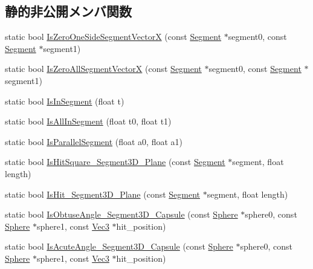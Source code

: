 \subsection*{静的非公開メンバ関数}
\begin{DoxyCompactItemize}
\item 
static bool \mbox{\hyperlink{class_collision_judgment_ab2e5a2c714c8c7c7f26ef9b025b57d01}{Is\+Zero\+One\+Side\+Segment\+VectorX}} (const \mbox{\hyperlink{class_segment}{Segment}} $\ast$segment0, const \mbox{\hyperlink{class_segment}{Segment}} $\ast$segment1)
\item 
static bool \mbox{\hyperlink{class_collision_judgment_adf77fae28d72345f9fda1668a1077f0d}{Is\+Zero\+All\+Segment\+VectorX}} (const \mbox{\hyperlink{class_segment}{Segment}} $\ast$segment0, const \mbox{\hyperlink{class_segment}{Segment}} $\ast$segment1)
\item 
static bool \mbox{\hyperlink{class_collision_judgment_a5fd5784d3e7d0ce09f5bda5603a8ca36}{Is\+In\+Segment}} (float t)
\item 
static bool \mbox{\hyperlink{class_collision_judgment_a4aa40ec5573967470aeac8f7cb59b67d}{Is\+All\+In\+Segment}} (float t0, float t1)
\item 
static bool \mbox{\hyperlink{class_collision_judgment_a5176f1eb6b0a2fd70efc0c08054064d0}{Is\+Parallel\+Segment}} (float a0, float a1)
\item 
static bool \mbox{\hyperlink{class_collision_judgment_a85481c15b123971458a612a31b1cc57e}{Is\+Hit\+Square\+\_\+\+Segment3\+D\+\_\+\+Plane}} (const \mbox{\hyperlink{class_segment}{Segment}} $\ast$segment, float length)
\item 
static bool \mbox{\hyperlink{class_collision_judgment_a0f5514dbfaa4dde5531cb6e5512502e5}{Is\+Hit\+\_\+\+Segment3\+D\+\_\+\+Plane}} (const \mbox{\hyperlink{class_segment}{Segment}} $\ast$segment, float length)
\item 
static bool \mbox{\hyperlink{class_collision_judgment_a58785d1cd51b4d7af4c19dca42d842e5}{Is\+Obtuse\+Angle\+\_\+\+Segment3\+D\+\_\+\+Capsule}} (const \mbox{\hyperlink{class_sphere}{Sphere}} $\ast$sphere0, const \mbox{\hyperlink{class_sphere}{Sphere}} $\ast$sphere1, const \mbox{\hyperlink{_vector3_d_8h_ab16f59e4393f29a01ec8b9bbbabbe65d}{Vec3}} $\ast$hit\+\_\+position)
\item 
static bool \mbox{\hyperlink{class_collision_judgment_af4da6d6923d8ee57253b1e86436e6ec5}{Is\+Acute\+Angle\+\_\+\+Segment3\+D\+\_\+\+Capsule}} (const \mbox{\hyperlink{class_sphere}{Sphere}} $\ast$sphere0, const \mbox{\hyperlink{class_sphere}{Sphere}} $\ast$sphere1, const \mbox{\hyperlink{_vector3_d_8h_ab16f59e4393f29a01ec8b9bbbabbe65d}{Vec3}} $\ast$hit\+\_\+position)

\end{DoxyCompactItemize}
